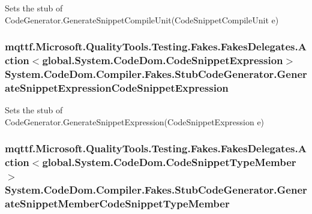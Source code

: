 Sets the stub of Code\-Generator.\-Generate\-Snippet\-Compile\-Unit(\-Code\-Snippet\-Compile\-Unit e)

\hypertarget{class_system_1_1_code_dom_1_1_compiler_1_1_fakes_1_1_stub_code_generator_af5f4f08feede98d3cbcbd554e4c7f39a}{
\subsubsection[{Generate\-Snippet\-Expression\-Code\-Snippet\-Expression}]{\setlength{\rightskip}{0pt plus 5cm}mqttf.\-Microsoft.\-Quality\-Tools.\-Testing.\-Fakes.\-Fakes\-Delegates.\-Action$<$global.\-System.\-Code\-Dom.\-Code\-Snippet\-Expression$>$ System.\-Code\-Dom.\-Compiler.\-Fakes.\-Stub\-Code\-Generator.\-Generate\-Snippet\-Expression\-Code\-Snippet\-Expression}}\label{class_system_1_1_code_dom_1_1_compiler_1_1_fakes_1_1_stub_code_generator_af5f4f08feede98d3cbcbd554e4c7f39a}


Sets the stub of Code\-Generator.\-Generate\-Snippet\-Expression(\-Code\-Snippet\-Expression e)

\hypertarget{class_system_1_1_code_dom_1_1_compiler_1_1_fakes_1_1_stub_code_generator_af8987b74dc7e337abb4317778fbcab95}{
\subsubsection[{Generate\-Snippet\-Member\-Code\-Snippet\-Type\-Member}]{\setlength{\rightskip}{0pt plus 5cm}mqttf.\-Microsoft.\-Quality\-Tools.\-Testing.\-Fakes.\-Fakes\-Delegates.\-Action$<$global.\-System.\-Code\-Dom.\-Code\-Snippet\-Type\-Member$>$ System.\-Code\-Dom.\-Compiler.\-Fakes.\-Stub\-Code\-Generator.\-Generate\-Snippet\-Member\-Code\-Snippet\-Type\-Member}}\label{class_system_1_1_code_dom_1_1_compiler_1_1_fakes_1_1_stub_code_generator_af8987b74dc7e337abb4317778fbcab95}


